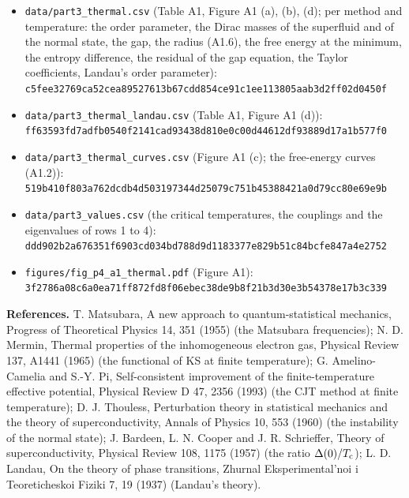 \documentclass[
  10pt,
]{article}
\providecommand{\tightlist}{%
  \setlength{\itemsep}{0pt}\setlength{\parskip}{0pt}}
\begin{document}
\begin{itemize}
\tightlist
\item
  \texttt{data/part3\_thermal.csv} (Table A1, Figure A1 (a), (b), (d);
  per method and temperature: the order parameter, the Dirac masses of
  the superfluid and of the normal state, the gap, the radius (A1.6),
  the free energy at the minimum, the entropy difference, the residual
  of the gap equation, the Taylor coefficients, Landau's order
  parameter):\\
  \texttt{c5fee32769ca52cea89527613b67cdd854ce91c1ee113805aab3d2ff02d0450f}
\item
  \texttt{data/part3\_thermal\_landau.csv} (Table A1, Figure A1 (d)):\\
  \texttt{ff63593fd7adfb0540f2141cad93438d810e0c00d44612df93889d17a1b577f0}
\item
  \texttt{data/part3\_thermal\_curves.csv} (Figure A1 (c); the
  free-energy curves (A1.2)):\\
  \texttt{519b410f803a762dcdb4d503197344d25079c751b45388421a0d79cc80e69e9b}
\item
  \texttt{data/part3\_values.csv} (the critical temperatures, the
  couplings and the eigenvalues of rows 1 to 4):\\
  \texttt{ddd902b2a676351f6903cd034bd788d9d1183377e829b51c84bcfe847a4e2752}
\item
  \texttt{figures/fig\_p4\_a1\_thermal.pdf} (Figure A1):\\
  \texttt{3f2786a08c6a0ea71ff872fd8f06ebec38de9b8f21b3d30e3b54378e17b3c339}
\end{itemize}

\textbf{References.} T. Matsubara, A new approach to quantum-statistical
mechanics, Progress of Theoretical Physics 14, 351 (1955) (the Matsubara
frequencies); N. D. Mermin, Thermal properties of the inhomogeneous
electron gas, Physical Review 137, A1441 (1965) (the functional of KS at
finite temperature); G. Amelino-Camelia and S.-Y. Pi, Self-consistent
improvement of the finite-temperature effective potential, Physical
Review D 47, 2356 (1993) (the CJT method at finite temperature); D. J.
Thouless, Perturbation theory in statistical mechanics and the theory of
superconductivity, Annals of Physics 10, 553 (1960) (the instability of
the normal state); J. Bardeen, L. N. Cooper and J. R. Schrieffer, Theory
of superconductivity, Physical Review 108, 1175 (1957) (the ratio
\(\Delta(0)/T_{\rm c}\)); L. D. Landau, On the theory of phase
transitions, Zhurnal Eksperimental'noi i Teoreticheskoi Fiziki 7, 19
(1937) (Landau's theory).
\end{document}
